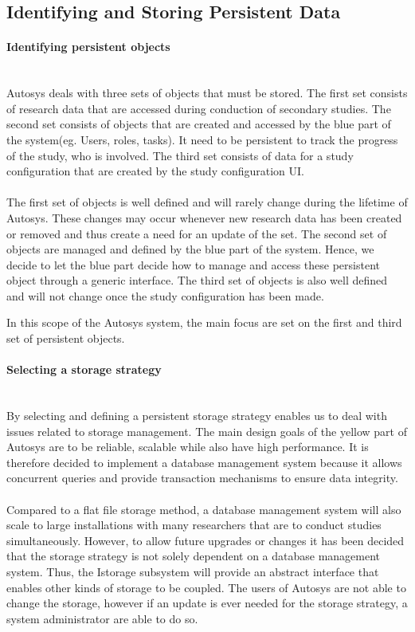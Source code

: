 \subsection{Identifying and Storing Persistent Data}
\paragraph{Identifying persistent objects}\mbox{}\\
Autosys deals with three sets of objects that must be stored.  The first set consists of research data that are accessed during conduction of secondary studies. The second set consists of objects that are created and accessed by the blue part of the system(eg. Users, roles, tasks). It need to be persistent to track the progress of the study, who is involved. The third set consists of data for a study configuration that are created by the study configuration UI.\\\\ The first set of objects is well defined and will rarely change during the lifetime of Autosys. These changes may occur whenever new research data has been created or removed and thus create a need for an update of the set. The second set of objects are managed and defined by the blue part of the system. Hence, we decide to let the blue part decide how to manage and access these persistent object through a generic interface. The third set of objects is also well defined and will not change once the study configuration has been made.

In this scope of the Autosys system, the main focus are set on the first and third set of persistent objects.  

\paragraph{Selecting a storage strategy}\mbox{}\\
By selecting and defining a persistent storage strategy enables us to deal with issues related to storage management. The main design goals of the yellow part of Autosys are to be reliable, scalable while also have high performance. It is therefore decided to implement a database management system because it allows concurrent queries and provide transaction mechanisms to ensure data integrity. \\\\Compared to a flat file storage method, a database management system will also scale to large installations with many researchers that are to conduct studies simultaneously. However, to allow future upgrades or changes it has been decided that the storage strategy is not solely dependent on a database management system. Thus, the Istorage subsystem will provide an abstract interface that enables other kinds of storage to be coupled. The users of Autosys are not able to change the storage, however if an update is ever needed for the storage strategy, a system administrator are able to do so.     